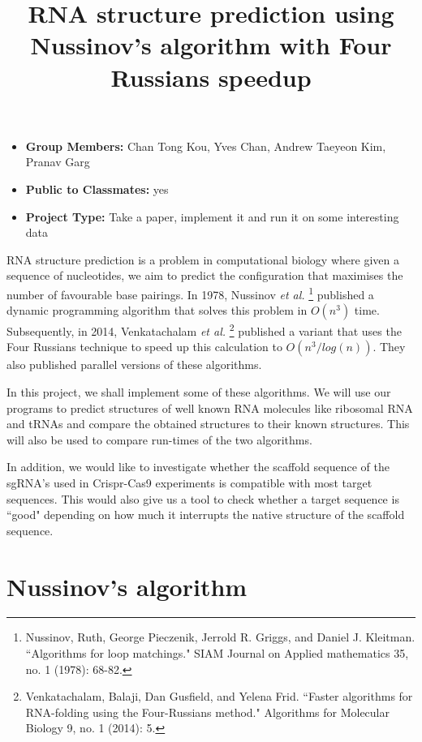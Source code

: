 \documentclass[11pt,a4paper]{article}
\title{RNA structure prediction using Nussinov's algorithm with Four Russians speedup}
\author{}
\date{}
\begin{document}
\maketitle

\vspace{-2cm}
\begin{itemize}

\item \textbf{Group Members:} Chan Tong Kou, Yves Chan, Andrew Taeyeon Kim, Pranav Garg
\item \textbf{Public to Classmates:} yes
\item \textbf{Project Type:} Take a paper, implement it and run it on some interesting data

\end{itemize}


RNA structure prediction is a problem in computational biology where given a sequence of nucleotides, we aim to predict the configuration that maximises the number of favourable base pairings. In 1978, Nussinov \textit{et al.} \footnote{Nussinov, Ruth, George Pieczenik, Jerrold R. Griggs, and Daniel J. Kleitman. ``Algorithms for loop matchings." SIAM Journal on Applied mathematics 35, no. 1 (1978): 68-82.} published a dynamic programming algorithm that solves this problem in $O(n^3)$ time. Subsequently, in 2014, Venkatachalam \textit{et al.} \footnote{Venkatachalam, Balaji, Dan Gusfield, and Yelena Frid. ``Faster algorithms for RNA-folding using the Four-Russians method." Algorithms for Molecular Biology 9, no. 1 (2014): 5.} published a variant that uses the Four Russians technique to speed up this calculation to $O(n^3/log(n))$. They also published parallel versions of these algorithms.

In this project, we shall implement some of these algorithms. We will use our programs to predict structures of well known RNA molecules like ribosomal RNA and tRNAs and compare the obtained structures to their known structures. This will also be used to compare run-times of the two algorithms.

In addition, we would like to investigate whether the scaffold sequence of the sgRNA's used in Crispr-Cas9 experiments is compatible with most target sequences. This would also give us a tool to check whether a target sequence is ``good" depending on how much it interrupts the native structure of the scaffold sequence.

\section{Nussinov's algorithm}
\end{document}
